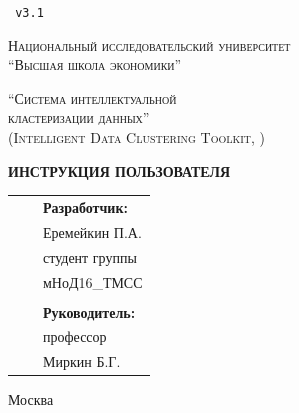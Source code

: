 \documentclass[12pt,tikz]{instruction}
\begin{document}
 
\begin{titlepage}
	\centering	
	\texttt { v3.1}

	{\scshape\small Национальный исследовательский университет \\
		``Высшая школа экономики'' \par}
	\vspace{2cm}
	{\scshape\Large ``Система интеллектуальной \\кластеризации данных'' \\
		(Intelligent Data Clustering Toolkit, \SysName)\par}
	\vspace{1.5cm}
	{\Huge\bfseries ИНСТРУКЦИЯ ПОЛЬЗОВАТЕЛЯ\par}
	\vspace{2cm}
	\vfill
	\begin{center}
		\begin{tabular}{  p{7cm}  p{4cm} p{5cm}  } 
			& & \textbf{Разработчик:}\\ 
			& & Еремейкин П.А. \\ 
			& & студент группы \\
			& & мНоД16\_ТМСС\\
			& & \\
			& & \textbf{Руководитель: }\\
			& & профессор\\
			& & Миркин Б.Г.\\
		\end{tabular}
	\end{center}
	\vfill
	{Москва \the\year\par}
\end{titlepage}

%
%	
\end{document}
